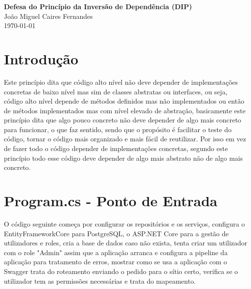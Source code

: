 \documentclass[12pt]{article}
\begin{document}
\begin{center}
    {\LARGE \textbf{Defesa do Princípio da Inversão de Dependência (DIP)}}\\[0.5cm]
    {\large João Miguel Caires Fernandes}\\
    {\large \today}
\end{center}

\vspace{1cm}

\section*{Introdução}

Este princípio dita que código alto nível não deve depender 
de implementações concretas de baixo nível mas sim de classes abstratas
ou interfaces, ou seja, código alto nível depende de métodos definidos mas não 
implementados ou então de métodos implementados mas com nível elevado de abstração, 
basicamente este princípio dita que algo pouco concreto não deve depender 
de algo mais concreto para funcionar, o que faz sentido, sendo que o propósito é 
facilitar o teste do código, tornar o código mais organizado e mais fácil de reutilizar.
Por isso em vez de fazer todo o código depender de implementações concretas, segundo este 
princípio todo esse código deve depender de algo mais abstrato não de algo mais concreto.  

\vspace{0.5cm}

\section*{Program.cs - Ponto de Entrada}
%
O código seguinte começa por configurar 
os repositórios e os serviços, configura
o EntityFrameworkCore para PostgreSQL, o 
ASP.NET Core para a gestão de utilizadores
e roles, cria a base de dados caso não exista,
tenta criar um utilizador com o role "Admin" 
assim que a aplicação arranca e configura a 
pipeline da aplicação para tratamento de erros, 
mostrar como se usa a aplicação com o Swagger 
trata do roteamento enviando o pedido para o sítio certo,
verifica se o utilizador tem as permissões necessárias e trata do mapeamento. 
\end{document}
